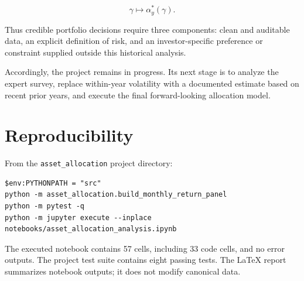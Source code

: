 \documentclass[11pt,a4paper]{article}
\begin{document}
\begin{equation}
\boxed{\gamma\longmapsto\alpha_y^*(\gamma)}.
\end{equation}

Thus credible portfolio decisions require three components: clean and auditable data, an explicit
definition of risk, and an investor-specific preference or constraint supplied outside this
historical analysis.

Accordingly, the project remains in progress. Its next stage is to analyze the expert survey,
replace within-year volatility with a documented estimate based on recent prior years, and execute
the final forward-looking allocation model.

\section{Reproducibility}

From the \texttt{asset\_allocation} project directory:

\begin{verbatim}
$env:PYTHONPATH = "src"
python -m asset_allocation.build_monthly_return_panel
python -m pytest -q
python -m jupyter execute --inplace notebooks/asset_allocation_analysis.ipynb
\end{verbatim}

The executed notebook contains 57 cells, including 33 code cells, and no error outputs. The
project test suite contains eight passing tests. The LaTeX report summarizes notebook outputs;
it does not modify canonical data.
\end{document}
